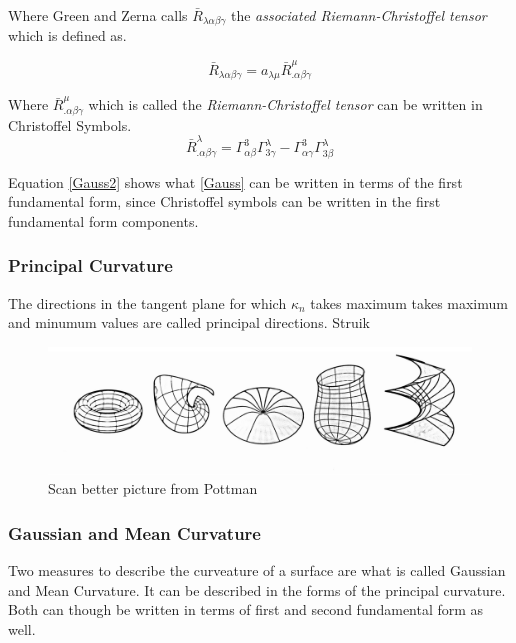 Where Green and Zerna calls $\bar{R}_{\lambda \alpha \beta \gamma}$ the  \textit{associated Riemann-Christoffel tensor} which is defined as.

\begin{equation}
 \bar{R}_{\lambda \alpha \beta \gamma} = a_{\lambda \mu} \bar{R}^\mu_{.\alpha \beta \gamma}
\end{equation}

 Where $\bar{R}^\mu_{.\alpha \beta \gamma}$ which is called the \textit{Riemann-Christoffel tensor} can be written in Christoffel Symbols.
\begin{equation} \label{Gauss2}
\bar{R}^\lambda_{.\alpha \beta \gamma} = \Gamma^3_{\alpha \beta} \Gamma^\lambda_{3\gamma}-\Gamma^3_{\alpha \gamma}\Gamma^\lambda_{3\beta} 
\end{equation}

Equation \ref{Gauss2} shows what \ref{Gauss} can be written in terms of the first fundamental form, since Christoffel symbols can be written in the first fundamental form components.


\subsubsection{Principal Curvature}

The directions in the tangent plane for which $\kappa_n$ takes maximum takes maximum and minumum values are called principal directions. Struik


\begin{figure}[H]
\centering
\includegraphics[width = 0.9\linewidth ]{figure/Theory/principalCurvature.pdf}
\caption{Scan better picture from Pottman }
\end{figure}


\subsubsection{Gaussian and Mean Curvature}

Two measures to describe the curveature of a surface are what is called Gaussian and Mean Curvature. It can be described in the forms of the principal curvature. Both can though be written in terms of first and second fundamental form as well.

